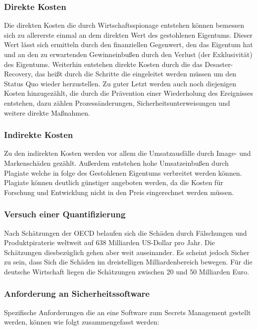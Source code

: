 \documentclass[
book,
a4paper,   
titlepage,  
halfparskip,
12pt        
]{scrartcl}
\begin{document}
\begin{onehalfspacing}
\subsubsection{Direkte Kosten}
Die direkten Kosten die durch Wirtschaftsspionage entstehen können bemessen sich zu allererste einmal an dem direkten Wert des gestohlenen Eigentums. Dieser Wert lässt sich ermitteln durch den finanziellen Gegenwert, den das Eigentum hat und an den zu erwartenden Gewinneinbußen durch den Verlust (der Exklusivität) des Eigentums. Weiterhin entstehen direkte Kosten durch die das Desaster-Recovery, das heißt durch die Schritte die eingeleitet werden müssen um den Status Quo wieder herzustellen. Zu guter Letzt werden auch noch diejenigen Kosten hinzugezählt, die durch die Prävention einer Wiederholung des Ereignisses entstehen, dazu zählen Prozessänderungen, Sicherheitsunterweisungen und weitere direkte Maßnahmen.\cite[S. 13]{kosten}
\subsubsection{Indirekte Kosten}
Zu den indirekten Kosten werden vor allem die Umsatzausfälle durch Image- und Markenschäden gezählt. Außerdem entstehen hohe Umsatzeinbußen durch Plagiate welche in folge des Gestohlenen Eigentums verbreitet werden können. Plagiate können deutlich günstiger angeboten werden, da die Kosten für Forschung und Entwicklung nicht in den Preis eingerechnet werden müssen.\cite[S. 14]{kosten}
\subsubsection{Versuch einer Quantifizierung}
Nach Schätzungen der \ac{OECD} belaufen sich die Schäden durch Fälschungen und Produktpiraterie weltweit auf 638 Milliarden US-Dollar pro Jahr. Die Schätzungen diesbezüglich gehen aber weit auseinander. Es scheint jedoch Sicher zu sein, dass Sich die Schäden im dreistelligen Milliardenbereich bewegen. Für die deutsche Wirtschaft liegen die Schätzungen zwischen 20 und 50 Milliarden Euro.\cite[S. 16f]{kosten}
\subsubsection{Anforderung an Sicherheitssoftware}
\label{subsubsec:anforderung}
Spezifische Anforderungen die an eine Software zum Secrets Management gestellt werden, können wie folgt zusammengefasst werden:


\end{onehalfspacing}
\end{document}
